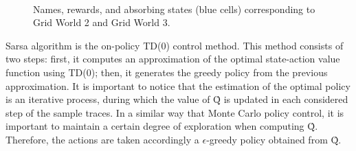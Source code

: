 \documentclass[10pt]{article}   	%
\begin{document}
\begin{figure}[ht!]
     \begin{center}
%
        \\ %
       \end{center}
    \caption{%
       Names, rewards, and absorbing states (blue cells) corresponding to Grid World 2 and Grid World 3. 
     }%
   \label{fig:gridWorld23}
\end{figure}

Sarsa algorithm is the on-policy TD(0) control method. This method consists of two steps: first, it computes an approximation of the optimal state-action value function using TD(0); then, it generates the greedy policy from the previous approximation. It is important to notice that the estimation of the optimal policy is an iterative process, during which the value of  \^{Q} is updated in each considered step of the sample traces. In a similar way that Monte Carlo policy control, it is important to maintain a certain degree of exploration when computing  \^{Q}. Therefore, the actions are taken accordingly a $\epsilon$-greedy policy obtained from \^{Q}.
\end{document}

